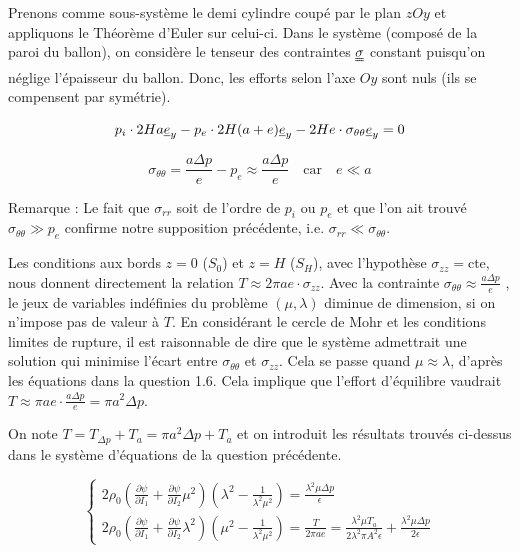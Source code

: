 \documentclass[a4paper,11pt]{article}
\newcommand{\tens}{\uuline}
\newcommand{\verseur}[1]{\uline{e}_{#1}}
\begin{document}
Prenons comme sous-système le demi cylindre coupé par le plan $zOy$ et appliquons le Théorème d'Euler sur celui-ci. Dans le système (composé de la paroi du ballon), on considère le tenseur des contraintes $\tens{\sigma}$ constant puisqu'on néglige l'épaisseur du ballon. Donc, les efforts selon l'axe $Oy$ sont nuls (ils se compensent par symétrie).

$$p_i \cdot 2Ha \verseur{y} - p_e \cdot 2H (a+e) \verseur{y} - 2He \cdot \sigma_{\theta\theta} \verseur{y} = 0$$

$$\sigma_{\theta\theta} = \frac{a\Delta p}{e} - p_e \approx  \frac{a\Delta p}{e} \quad\mathrm{car }\quad e \ll a$$

Remarque : Le fait que $\sigma_{rr}$ soit de l'ordre de $p_i$ ou $p_e$ et que l'on ait trouvé $\sigma_{\theta\theta} \gg p_e$ confirme notre supposition précédente, i.e. $\sigma_{rr} \ll \sigma_{\theta\theta}$.

Les conditions aux bords $z=0$ ($S_0$) et $z=H$ ($S_H$), avec l'hypothèse $\sigma_{zz} = \mathrm{cte}$, nous donnent directement la relation $T \approx 2\pi a e \cdot \sigma_{zz}$. Avec la contrainte $\sigma_{\theta\theta} \approx \frac{a\Delta p}{e}$ , le jeux de variables indéfinies du problème $(\mu, \lambda)$ diminue de dimension, si on n'impose pas de valeur à $T$. En considérant le cercle de Mohr et les conditions limites de rupture, il est raisonnable de dire que le système admettrait une solution qui minimise l'écart entre $\sigma_{\theta\theta}$ et $\sigma_{zz}$. Cela se passe quand $\mu \approx \lambda$, d'après les équations dans la question 1.6. Cela implique que l'effort d'équilibre vaudrait $T \approx \pi ae \cdot \frac{a\Delta p}{e} = \pi a^2 \Delta p$.

On note $T = T_{\Delta p} + T_a = \pi a^2 \Delta p + T_a$ et on introduit les résultats trouvés ci-dessus dans le système d'équations de la question précédente.

$$
\begin{cases}
2\rho_0 \left (\frac{\partial\psi}{\partial I_1} + \frac{\partial\psi}{\partial I_2} \mu^2 \right) \left ( \lambda^2 - \frac{1}{\lambda^2\mu^2} \right) = \frac{\lambda^2\mu \Delta p}{\epsilon} \\
2\rho_0 \left (\frac{\partial\psi}{\partial I_1} + \frac{\partial\psi}{\partial I_2} \lambda^2 \right) \left ( \mu^2 - \frac{1}{\lambda^2\mu^2} \right) = \frac{T}{2\pi ae} = \frac{\lambda^2\mu T_a}{2\lambda^2\pi A^2 \epsilon } + \frac{\lambda^2\mu\Delta p}{2\epsilon}
\end{cases}
$$
\end{document}
